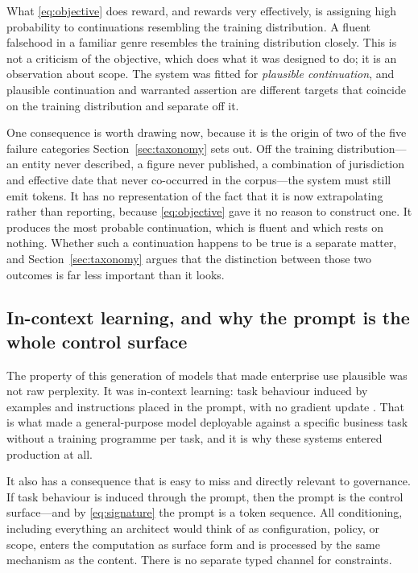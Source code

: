 What \eqref{eq:objective} does reward, and rewards very effectively, is assigning
high probability to continuations resembling the training distribution. A fluent
falsehood in a familiar genre resembles the training distribution closely. This is
not a criticism of the objective, which does what it was designed to do; it is an
observation about scope. The system was fitted for \emph{plausible continuation},
and plausible continuation and warranted assertion are different targets that
coincide on the training distribution and separate off it.

One consequence is worth drawing now, because it is the origin of two of the
five failure categories Section~\ref{sec:taxonomy} sets out. Off the training
distribution---an entity never described, a figure never published, a combination
of jurisdiction and effective date that never co-occurred in the corpus---the
system must still emit tokens. It has no representation of the fact that it is now
extrapolating rather than reporting, because \eqref{eq:objective} gave it no
reason to construct one. It produces the most probable continuation, which is
fluent and which rests on nothing. Whether such a continuation happens to be true
is a separate matter, and Section~\ref{sec:taxonomy} argues that the distinction
between those two outcomes is far less important than it looks.

\subsection{In-context learning, and why the prompt is the whole control surface}
\label{sec:icl}

The property of this generation of models that made enterprise use plausible was
not raw perplexity. It was in-context learning: task behaviour induced by
examples and instructions placed in the prompt, with no gradient update
\citep{brown2020}. That is what made a general-purpose model deployable against a
specific business task without a training programme per task, and it is why these
systems entered production at all.

It also has a consequence that is easy to miss and directly relevant to
governance. If task behaviour is induced through the prompt, then the prompt is the
control surface---and by \eqref{eq:signature} the prompt is a token sequence. All
conditioning, including everything an architect would think of as configuration,
policy, or scope, enters the computation as surface form and is processed by the
same mechanism as the content. There is no separate typed channel for constraints.

